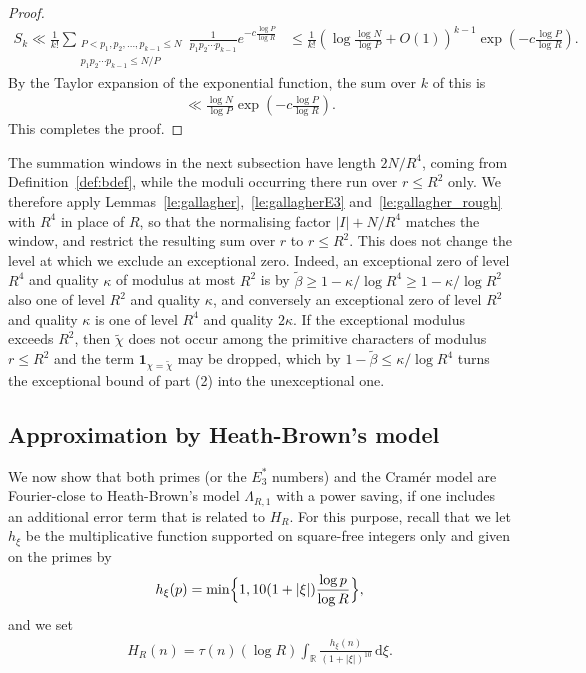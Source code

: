 \documentclass[12pt]{amsart}
\theoremstyle{definition}
\theoremstyle{remark}
\numberwithin{equation}{section}
\newcommand{\1}{\mathbf{1}}
\renewcommand\d{\,\mathrm{d}}
\begin{document}
\begin{proof}
 \begin{align*}
    S_k\ll \frac{1}{k!}  \sum_{\substack{P< p_1,p_2,\ldots, p_{k-1}\leq N \\ p_1p_2\cdots p_{k-1}\leq  N/P}} \frac{1}{p_1p_2\cdots p_{k-1}} e^{-c \frac{\log P}{\log R}}&\leq  \frac{1}{ k!}   \left(\log \frac{\log N}{\log P}+O(1)\right)^{k-1} \exp\left(-c\frac{\log P }{\log R}\right).
 \end{align*}
 By the Taylor expansion of the exponential function, the sum over $k$ of this is 
 \begin{align*}
    \ll \frac{\log N}{\log P}\exp\left(-c\frac{\log P }{\log R}\right).
 \end{align*}
 This completes the proof.
\end{proof}



The summation windows in the next subsection have length $2N/R^4$, coming from Definition~\ref{def:bdef}, while the moduli occurring there run over $r\leq R^2$ only. We therefore apply Lemmas~\ref{le:gallagher},~\ref{le:gallagherE3} and~\ref{le:gallagher_rough} with $R^4$ in place of $R$, so that the normalising factor $|I|+N/R^4$ matches the window, and restrict the resulting sum over $r$ to $r\leq R^2$. This does not change the level at which we exclude an exceptional zero. Indeed, an exceptional zero of level $R^4$ and quality $\kappa$ of modulus at most $R^2$ is by $\widetilde{\beta}\geq 1-\kappa/\log R^4\geq 1-\kappa/\log R^2$ also one of level $R^2$ and quality $\kappa$, and conversely an exceptional zero of level $R^2$ and quality $\kappa$ is one of level $R^4$ and quality $2\kappa$. If the exceptional modulus exceeds $R^2$, then $\widetilde{\chi}$ does not occur among the primitive characters of modulus $r\leq R^2$ and the term $\1_{\chi=\widetilde{\chi}}$ may be dropped, which by $1-\widetilde{\beta}\leq \kappa/\log R^4$ turns the exceptional bound of part (2) into the unexceptional one.

\subsection{Approximation by Heath-Brown's model}\label{subsec:7.3}

We now show that both primes (or the $E_3^*$ numbers) and the Cram\'er model are Fourier-close to Heath-Brown's model $\Lambda_{R,1}$ with a power saving, if one includes an additional error term that is related to $H_R$. For this purpose, recall that we let $h_{\xi}$  be the multiplicative function supported on square-free integers only and given on the primes by 
 \begin{align*}
        h_{\xi}(p)=\min\Bigl\{1,10(1+|\xi|)\frac{\log p}{\log R} \Bigr\},
    \end{align*}
and we set 
\begin{align*}
    H_R(n)=\tau(n)(\log R) \int_{\mathbb{R}} \frac{h_{\xi}(n)}{(1+|\xi|)^{10}}\d \xi.
\end{align*}
\end{document}

